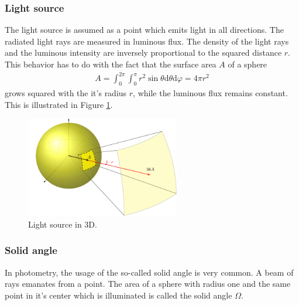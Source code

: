 \subsubsection{Light source}
The light source is assumed as a point which emits light in all directions.
The radiated light rays are measured in luminous flux. The density of the light rays and the luminous intensity are inversely proportional to the squared distance $r$.
This behavior has to do with the fact that the surface area $A$ of a sphere
\begin{align*}
A=\int_{0}^{2 \pi} \int_{0}^{\pi} r^{2} \sin \theta \text{d} \theta \text{d} \varphi=4 \pi r^{2}
\end{align*}
grows squared with the it's radius $r$, while the luminous flux remains constant.
This is illustrated in Figure \ref{theory:light}.
\begin{figure}[ht]
	\centering
	\includegraphics[width=0.6\textwidth]{2-theory/backlight/light.pdf}
	\caption{Light source in 3D.\label{theory:light}}
\end{figure} 

\subsubsection{Solid angle}
In photometry, the usage of the so-called solid angle is very common.
A beam of rays emanates from a point. The area of a sphere with radius one and the same point in it's center which is illuminated is called the solid angle $\Omega$.
